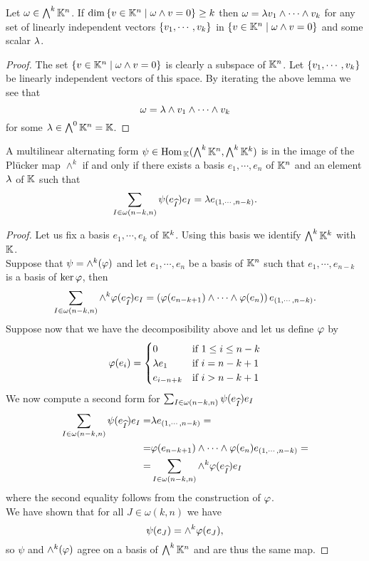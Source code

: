 \begin{corollary}\label{TotalDecomposibilityCriterion}
Let $\omega\in \bigwedge^k\mathbb{K}^n$. If $\dim\left\{{v\in\mathbb{K}^n\mid \omega\wedge v=0}\right\}\geq k$ then $\omega=\lambda v_1\wedge \cdots\wedge v_k$ for any set of linearly independent vectors $\left\{{v_1,\cdots, v_k}\right\}$ in $\left\{{v\in\mathbb{K}^n\mid \omega\wedge v=0}\right\}$ and some scalar $\lambda$.
\end{corollary}
\begin{proof}
The set $\left\{{v\in\mathbb{K}^n\mid \omega\wedge v=0}\right\}$ is clearly a subspace of $\mathbb{K}^n$. Let $\left\{{v_1,\cdots, v_k}\right\}$ be linearly independent vectors of this space. By iterating the above lemma we see that
\[\omega=\lambda\wedge v_1\wedge\cdots\wedge v_k\]
for some $\lambda\in \bigwedge^0\mathbb{K}^n=\mathbb{K}$.
\end{proof}

\begin{lemma}\label{DecomposabilityOfMultilinearForm}
A multilinear alternating form $\psi\in \mathrm{Hom}\,_{\mathbb{K}}(\bigwedge^k\mathbb{K}^n,\bigwedge^k\mathbb{K}^k)$ is in the image of the Pl\"ucker map $\wedge^k$ if and only if there exists a basis $e_1,\cdots, e_n$ of $\mathbb{K}^n$ and an element $\lambda$ of $\mathbb{K}$ such that
\[\sum_{I\in \omega(n-k,n)}\psi(e_{\widehat{I}})e_I=\lambda e_{(1,\cdots, n-k)}.\]
\end{lemma}
\begin{proof}
Let us fix a basis $e_1,\cdots, e_k$ of $\mathbb{K}^k$. Using this basis we identify $\bigwedge^k\mathbb{K}^k$ with $\mathbb{K}$.\\
Suppose that $\psi=\wedge^k(\varphi)$ and let $e_1,\cdots, e_n$ be a basis of $\mathbb{K}^n$ such that $e_1,\cdots, e_{n-k}$ is a basis of $\ker \varphi$, then
\[\sum_{I\in \omega(n-k,n)}\wedge^k\varphi(e_{\widehat{I}})e_I=\left({\varphi(e_{n-k+1})\wedge \cdots\wedge \varphi(e_{n})}\right) e_{\left({1,\cdots, n-k}\right)}.\]
Suppose now that we have the decomposibility above and let us define $\varphi$ by
\[\varphi(e_i)=\begin{cases}
0 & \text{if }1\leq i\leq n-k\\
\lambda e_1 & \text{if }i=n-k+1\\
e_{i-n+k} & \text{if }i>n-k+1
\end{cases}\]
We now compute a second form for $\sum_{I\in \omega(n-k,n)}\psi(e_{\widehat{I}})e_I$
\begin{align*}
\sum_{I\in \omega(n-k,n)}\psi(e_{\widehat{I}})e_I=&\lambda e_{(1,\cdots, n-k)}=\\
=&\varphi(e_{n-k+1})\wedge\cdots\wedge\varphi(e_n) e_{(1,\cdots, n-k)}=\\
=&\sum_{I\in \omega(n-k,n)}\wedge^k\varphi(e_{\widehat{I}})e_I
\end{align*}
where the second equality follows from the construction of $\varphi$.\\
We have shown that for all $J\in\omega(k,n)$ we have
\[\psi(e_J)=\wedge^k \varphi(e_J),\]
so $\psi$ and $\wedge^k(\varphi)$ agree on a basis of $\bigwedge^k\mathbb{K}^n$ and are thus the same map. 
\end{proof}

